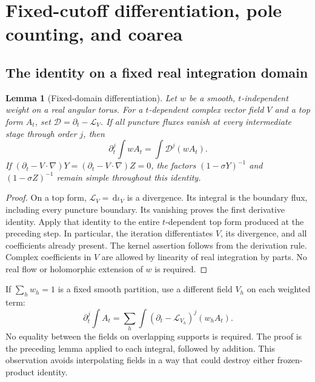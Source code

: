 \documentclass[11pt]{article}
\numberwithin{equation}{section}
\newtheorem{lemma}[theorem]{Lemma}
\theoremstyle{definition}
\newcommand{\dd}{\,\mathrm d}
\newcommand{\Li}{\mathcal L}
\begin{document}
\appendix
\section{Fixed-cutoff differentiation, pole counting, and coarea}
\label{app:lie}

\subsection{The identity on a fixed real integration domain}
\begin{lemma}[Fixed-domain differentiation]\label{lem:lie}
Let \(w\) be a smooth, \(t\)-independent weight on a real angular torus.
For a \(t\)-dependent complex vector field \(V\) and a top form \(A_t\),
set \(\mathcal D=\partial_t-\Li_V\). If all puncture fluxes vanish
at every intermediate stage through order \(j\), then
\[
 \partial_t^j\int wA_t=\int\mathcal D^j(wA_t).
\]
If \((\partial_t-V\cdot\nabla)Y
=(\partial_t-V\cdot\nabla)Z=0\), the factors
\((1-\sigma Y)^{-1}\) and \((1-\sigma Z)^{-1}\) remain simple throughout this identity.
\end{lemma}
\begin{proof}
On a top form, \(\Li_V=\dd\iota_V\) is a divergence. Its integral is the
boundary flux, including every puncture boundary. Its vanishing proves
the first derivative identity. Apply that identity to the entire
\(t\)-dependent top form produced at the preceding step. In particular,
the iteration differentiates \(V\), its divergence, and all coefficients
already present. The kernel assertion follows from the derivation rule.
Complex coefficients in \(V\) are allowed by linearity of real
integration by parts. No real flow or holomorphic extension of \(w\)
is required.
\end{proof}

If \(\sum_h w_h=1\) is a fixed smooth partition, use a different field
\(V_h\) on each weighted term:
\begin{equation}
 \partial_t^j\int A_t
   =\sum_h\int(\partial_t-\Li_{V_h})^j(w_hA_t).
 \label{eq:chartwiseLie}
\end{equation}
No equality between the fields on overlapping supports is required.
The proof is the preceding lemma applied to each integral, followed
by addition. This observation avoids interpolating fields in a way
that could destroy either frozen-product identity.
\end{document}
